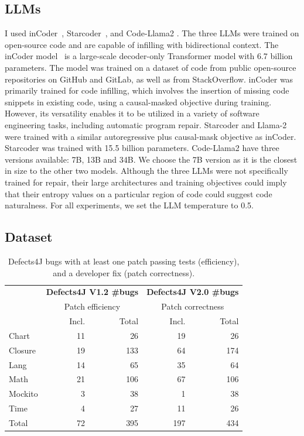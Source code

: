 \documentclass[12pt,openany,oneside,table]{cmuthesis}
\begin{document}
\subsection{LLMs}
\label{sec:llms}

I used inCoder~\cite{inCoder}, Starcoder~\cite{Starcoder}, and Code-Llama2
\cite{Llama}. The three LLMs were trained on open-source code and are capable of
infilling with bidirectional context. The inCoder model~\cite{inCoder} is a
large-scale decoder-only Transformer model with 6.7 billion parameters. The
model was trained on a dataset of code from public open-source repositories on
GitHub and GitLab, as well as from StackOverflow. 
inCoder was primarily trained for code infilling, which involves the insertion
of missing code snippets in existing code, using a causal-masked objective
during training. However, its versatility enables it to be utilized in a variety
of software engineering tasks, including automatic program repair. Starcoder and
Llama-2 were trained with a similar autoregressive plus causal-mask objective as
inCoder. Starcoder was trained with 15.5 billion parameters. Code-Llama2 have
three versions available: 7B, 13B and 34B. We choose the 7B version as it is
the closest in size to the other two models. Although the three LLMs were
not specifically trained for repair, their large architectures and training
objectives could imply that their entropy values on a particular region of code
could suggest code naturalness. For all experiments, we set the LLM temperature
to 0.5.

\subsection{Dataset}
\label{sec:dataset}

\begin{table}[t]
    \centering
  \caption{\small Defects4J bugs with at least one patch passing tests (efficiency), and a developer fix (patch correctness).}
  \begin{tabular}{l|rr|rr}
  \toprule
  & \multicolumn{2}{c}{\textbf{Defects4J V1.2 \#bugs}}  & \multicolumn{2}{c}{\textbf{Defects4J V2.0 \#bugs}}  \\
  & \multicolumn{2}{c}{Patch efficiency}  & \multicolumn{2}{c}{Patch
  correctness}  \\
  & Incl. & Total & Incl. & Total \\
  \midrule
  Chart  & 11  & 26 & 19  & 26\\
  Closure  & 19 & 133&  64 & 174\\
  Lang  & 14 &65& 35 & 64\\
  Math  & 21 & 106 & 67  & 106\\
  Mockito  & 3 & 38&  1  &38\\
  Time  & 4 & 27  & 11 & 26\\
  \midrule
  Total & 72 & 395 & 197 & 434 \\
  \bottomrule
  \end{tabular}
  \label{table:datasets}
  \end{table}
\end{document}

